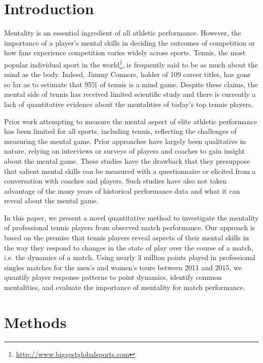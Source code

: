 \documentclass{Latex/svjour3}
\begin{document}
\section{Introduction}

Mentality is an essential ingredient of all athletic performance. However, the
importance of a player's mental skills in deciding the outcomes of competition
or how fans experience competition varies widely across sports. Tennis, the most
popular individual sport in the
world\footnote{\url{http://www.biggestglobalsports.com}}, is frequently said to
be as much about the mind as the body. Indeed, Jimmy Connors, holder of 109
career titles, has gone so far as to estimate that 95\% of tennis is a mind
game\cite{samulski2007tennis}. Despite these claims, the mental side of tennis
has received limited scientific study and there is currently a lack of
quantitative evidence about the mentalities of today's top tennis players.

Prior work attempting to measure the mental aspect of elite athletic performance
has been limited for all sports, including tennis, reflecting the challenges of
measuring the mental game. Prior approaches have largely been qualitative in
nature, relying on interviews\cite{young2011understanding} or
surveys\cite{taylor1987predicting} of players and coaches to gain insight about
the mental game. These studies have the drawback that they presuppose that
salient mental skills can be measured with a questionnaire or elicited from a
conversation with coaches and players. Such studies have also not taken
advantage of the many years of historical performance data and what it can
reveal about the mental game. 

In this paper, we present a novel quantitative method to investigate the
mentality of professional tennis players from observed match performance. Our
approach is based on the premise that tennis players reveal aspects of their
mental skills in the way they respond to changes in the state of play over the
course of a match, i.e. the dynamics of a match. Using nearly 3 million points
played in professional singles matches for the men's and women's tours between
2011 and 2015, we quantify player response patterns to point dynamics, identify
common mentalities, and evaluate the importance of mentality for match
performance.


\section{Methods}
\end{document}
